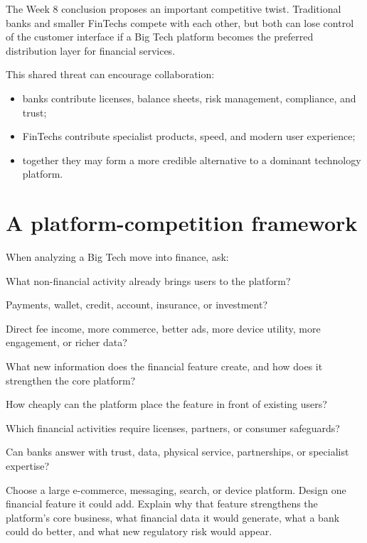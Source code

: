 The Week 8 conclusion proposes an important competitive twist. Traditional banks and smaller FinTechs compete with each other, but both can lose control of the customer interface if a Big Tech platform becomes the preferred distribution layer for financial services.

This shared threat can encourage collaboration:

\begin{itemize}
  \item banks contribute licenses, balance sheets, risk management, compliance, and trust;
  \item FinTechs contribute specialist products, speed, and modern user experience;
  \item together they may form a more credible alternative to a dominant technology platform.
\end{itemize}

\section{A platform-competition framework}

When analyzing a Big Tech move into finance, ask:

\begin{mlsteps}
  \item {} What non-financial activity already brings users to the platform?
  \item {} Payments, wallet, credit, account, insurance, or investment?
  \item {} Direct fee income, more commerce, better ads, more device utility, more engagement, or richer data?
  \item {} What new information does the financial feature create, and how does it strengthen the core platform?
  \item {} How cheaply can the platform place the feature in front of existing users?
  \item {} Which financial activities require licenses, partners, or consumer safeguards?
  \item {} Can banks answer with trust, data, physical service, partnerships, or specialist expertise?
\end{mlsteps}

\begin{tryit}
Choose a large e-commerce, messaging, search, or device platform. Design one financial feature it could add. Explain why that feature strengthens the platform's core business, what financial data it would generate, what a bank could do better, and what new regulatory risk would appear.
\end{tryit}

